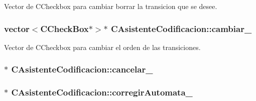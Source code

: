 Vector de C\+Checkbox para cambiar borrar la transicion que se desee. 

\subsubsection[{\texorpdfstring{cambiar\+\_\+}{cambiar_}}]{\setlength{\rightskip}{0pt plus 5cm}vector$<${\bf C\+Check\+Box}$\ast$$>$$\ast$ C\+Asistente\+Codificacion\+::cambiar\+\_\+\hspace{0.3cm}{\ttfamily [private]}}\hypertarget{classCAsistenteCodificacion_a7c50f4349d8de445b66d49a1a34df74a}{}\label{classCAsistenteCodificacion_a7c50f4349d8de445b66d49a1a34df74a}


Vector de C\+Checkbox para cambiar el orden de las transiciones. 

\subsubsection[{\texorpdfstring{cancelar\+\_\+}{cancelar_}}]{$\ast$ C\+Asistente\+Codificacion\+::cancelar\+\_\+\hspace{0.3cm}{\ttfamily [private]}}\hypertarget{classCAsistenteCodificacion_a38cc5ae5adde6fa070e0ce0974de7778}{}\label{classCAsistenteCodificacion_a38cc5ae5adde6fa070e0ce0974de7778}
\subsubsection[{\texorpdfstring{corregir\+Automata\+\_\+}{corregirAutomata_}}]{$\ast$ C\+Asistente\+Codificacion\+::corregir\+Automata\+\_\+\hspace{0.3cm}{\ttfamily [private]}}\hypertarget{classCAsistenteCodificacion_afd75aaa033b9e2147f82bdb64db6fecf}{}\label{classCAsistenteCodificacion_afd75aaa033b9e2147f82bdb64db6fecf}


